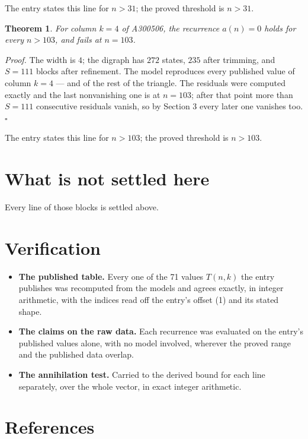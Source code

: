 \documentclass[11pt]{article}
\newtheorem{theorem}{Theorem}
\theoremstyle{definition}
\begin{document}
The entry states this line for $n > 31$; the proved threshold is $n > 31$.

\begin{theorem} For column $k = 4$ of A300506, the recurrence $a(n) = 0$ holds for every $n > 103$, and fails at $n = 103$.\end{theorem}

{\itshape Proof.} The width is $4$; the digraph has $272$ states, $235$ after trimming, and $S = 111$ blocks after refinement. The model reproduces every published value of column $k = 4$ --- and of the rest of the triangle. The residuals were computed exactly and the last nonvanishing one is at $n = 103$; after that point more than $S = 111$ consecutive residuals vanish, so by Section 3 every later one vanishes too. $\square$

The entry states this line for $n > 103$; the proved threshold is $n > 103$.

\section{What is not settled here}

Every line of those blocks is settled above.

\section{Verification}

\begin{itemize}

\item {\bfseries The published table.} Every one of the 71 values $T(n,k)$ the entry publishes was recomputed from the models and agrees exactly, in integer arithmetic, with the indices read off the entry's offset (1) and its stated shape.

\item {\bfseries The claims on the raw data.} Each recurrence was evaluated on the entry's published values alone, with no model involved, wherever the proved range and the published data overlap.

\item {\bfseries The annihilation test.} Carried to the derived bound for each line separately, over the whole vector, in exact integer arithmetic.

\end{itemize}

\section{References}
\end{document}
